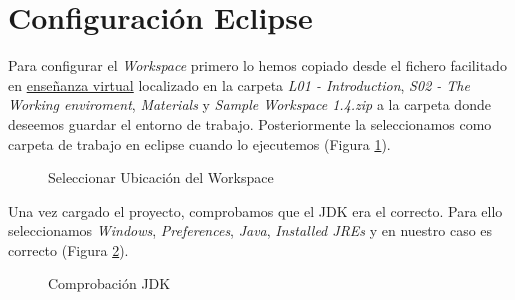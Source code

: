 \documentclass{scrartcl}
\begin{document}
\section{Configuración Eclipse}
Para configurar el \textit{Workspace} primero lo hemos copiado desde el fichero facilitado en \href{https://ev.us.es}{enseñanza virtual} localizado en la carpeta \textit{L01 - Introduction}, \textit{S02 - The Working enviroment}, \textit{Materials} y \textit{Sample Workspace 1.4.zip} a la carpeta donde deseemos guardar el entorno de trabajo. Posteriormente la seleccionamos como carpeta de trabajo en eclipse cuando lo ejecutemos (Figura \ref{fig:ConfEcl01}).

\begin{figure}[H]
	
	\centering
	\caption{Seleccionar Ubicación del Workspace}
	\label{fig:ConfEcl01}
	
\end{figure}

Una vez cargado el proyecto, comprobamos que el JDK era el correcto. Para ello seleccionamos \textit{Windows}, \textit{Preferences}, \textit{Java}, \textit{Installed JREs} y en nuestro caso es correcto (Figura \ref{fig:ConfEcl02}).
\begin{figure}[H]
	
	\centering
	\caption{Comprobación JDK}
	\label{fig:ConfEcl02}
	
\end{figure}
\end{document}

